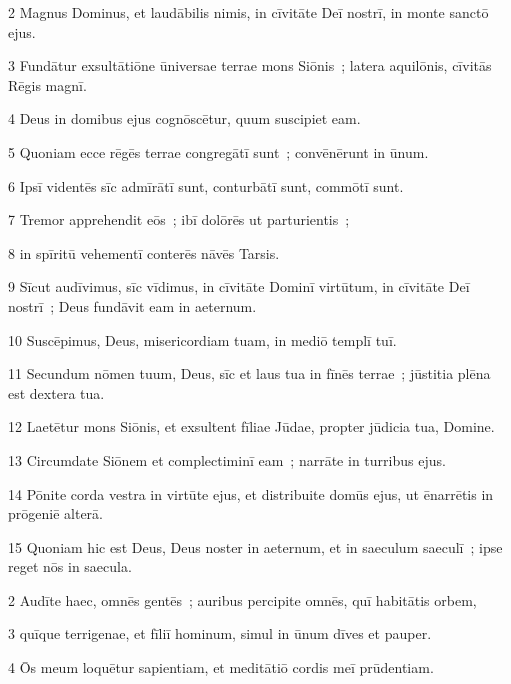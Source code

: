 \psalmVerse
  {\phantom{00}2}
  {Magnus Dominus, et laudābilis nimis, in cīvitāte Deī nostrī, in monte sanctō ejus.}


\psalmVerse
  {\phantom{00}3}
  {Fundātur exsultātiōne ūniversae terrae mons Siōnis~; latera aquilōnis, cīvitās Rēgis magnī.}


\psalmVerse
  {\phantom{00}4}
  {Deus in domibus ejus cognōscētur, quum suscipiet eam.}


\psalmVerse
  {\phantom{00}5}
  {Quoniam ecce rēgēs terrae congregātī sunt~; convēnērunt in ūnum.}


\psalmVerse
  {\phantom{00}6}
  {Ipsī videntēs sīc admīrātī sunt, conturbātī sunt, commōtī sunt.}


\psalmVerse
  {\phantom{00}7}
  {Tremor apprehendit eōs~; ibī dolōrēs ut parturientis~;}


\psalmVerse
  {\phantom{00}8}
  {in spīritū vehementī conterēs nāvēs Tarsis.}


\psalmVerse
  {\phantom{00}9}
  {Sīcut audīvimus, sīc vīdimus, in cīvitāte Dominī virtūtum, in cīvitāte Deī nostrī~; Deus fundāvit eam in aeternum.}


\psalmVerse
  {\phantom{0}10}
  {Suscēpimus, Deus, misericordiam tuam, in mediō templī tuī.}


\psalmVerse
  {\phantom{0}11}
  {Secundum nōmen tuum, Deus, sīc et laus tua in fīnēs terrae~; jūstitia plēna est dextera tua.}


\psalmVerse
  {\phantom{0}12}
  {Laetētur mons Siōnis, et exsultent fīliae Jūdae, propter jūdicia tua, Domine.}


\psalmVerse
  {\phantom{0}13}
  {Circumdate Siōnem et complectiminī eam~; narrāte in turribus ejus.}


\psalmVerse
  {\phantom{0}14}
  {Pōnite corda vestra in virtūte ejus, et distribuite domūs ejus, ut ēnarrētis in prōgeniē alterā.}


\psalmVerse
  {\phantom{0}15}
  {Quoniam hic est Deus, Deus noster in aeternum, et in saeculum saeculī~; ipse reget nōs in saecula.}



\psalmVerse
  {\phantom{00}2}
  {Audīte haec, omnēs gentēs~; auribus percipite omnēs, quī habitātis orbem,}


\psalmVerse
  {\phantom{00}3}
  {quīque terrigenae, et fīliī hominum, simul in ūnum dīves et pauper.}


\psalmVerse
  {\phantom{00}4}
  {Ōs meum loquētur sapientiam, et meditātiō cordis meī prūdentiam.}


